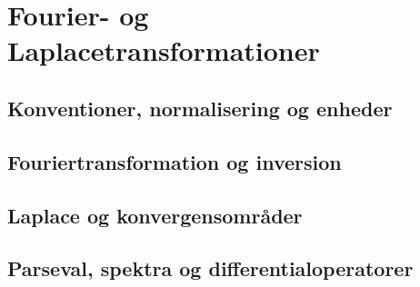 \chapter{Fourier- og Laplacetransformationer}
\section{Konventioner, normalisering og enheder}
\leavevmode\par

\section{Fouriertransformation og inversion}
\leavevmode\par

\section{Laplace og konvergensområder}
\leavevmode\par

\section{Parseval, spektra og differentialoperatorer}
\leavevmode\par
